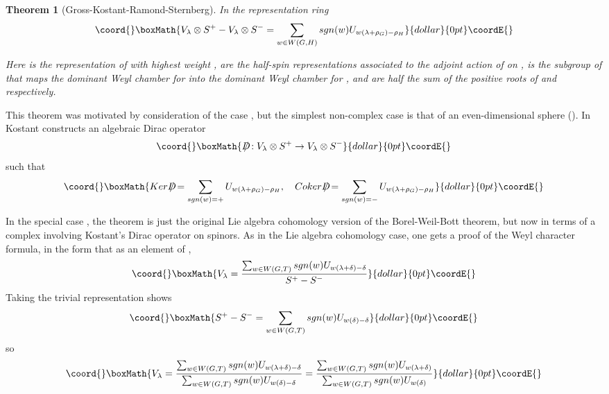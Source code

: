 \documentclass[a4paper,a4paper]{article}
\newtheorem{theorem}{Theorem}
\theoremstyle{conjecture}
\def\Slash#1{#1\!\!\!\!/}
\def\Dirac{\Slash D}
\begin{document}
\begin{theorem}[Gross-Kostant-Ramond-Sternberg]
In the representation ring \coordHE{}  $$\coord{}\boxMath{V_\lambda \otimes S^+ -V_\lambda \otimes S^- = \sum _{w\in W(G,H)} sgn(w)U_{w(\lambda+\rho_G)-\rho_H}}{dollar}{0pt}\coordE{}$$

Here \coordHE{} is the representation of \coordHE{} with highest weight \myHighlight{$\mu$}\coordHE{},
\coordHE{} are the half-spin representations associated to the adjoint
action of \coordHE{} on \coordHE{}, \coordHE{} is
the subgroup of \coordHE{} that maps the dominant Weyl chamber for \coordHE{} into the
dominant Weyl chamber for \coordHE{}, and \coordHE{} are half the sum of the
positive roots of \coordHE{} and \coordHE{} respectively.
\end{theorem}

This theorem was motivated by consideration of the case \coordHE{},
but the simplest non-complex case is that of \coordHE{} an even-dimensional
sphere (\coordHE{}). In \cite{Kostant2} Kostant constructs an algebraic
Dirac operator
$$\coord{}\boxMath{\Dirac :V_\lambda \otimes S^+\rightarrow V_\lambda \otimes S^-}{dollar}{0pt}\coordE{}$$
such that
$$\coord{}\boxMath{ Ker \Dirac =\sum_{sgn(w)=+}U_{w(\lambda+\rho_G)-\rho_H}, \ \ \
Coker \Dirac =\sum_{sgn(w)=-}U_{w(\lambda+\rho_G)-\rho_H}}{dollar}{0pt}\coordE{}$$

In the special case \coordHE{} \cite{Kostant3}, the theorem is just the original Lie algebra
cohomology version of the Borel-Weil-Bott theorem, but now in terms of
a complex involving Kostant's Dirac operator on spinors. As in the Lie algebra cohomology
case, one gets a proof of the Weyl character formula, in the form that as an element of \coordHE{},
$$\coord{}\boxMath{V_\lambda=\frac{\sum _{w\in W(G,T)} sgn(w)U_{w(\lambda+\delta)-\delta}}{S^+ -S^-}}{dollar}{0pt}\coordE{}$$
Taking \myHighlight{$V_\lambda$}\coordHE{} the trivial representation shows
$$\coord{}\boxMath{ S^+ -S^-=\sum _{w\in W(G,T)} sgn(w)U_{w(\delta)-\delta}}{dollar}{0pt}\coordE{}$$
so
$$\coord{}\boxMath{V_\lambda=\frac{\sum _{w\in W(G,T)} sgn(w)U_{w(\lambda+\delta)-\delta}}{\sum _{w\in W(G,T)} sgn(w)U_{w(\delta)-\delta}}=
\frac{\sum _{w\in W(G,T)} sgn(w)U_{w(\lambda+\delta)}}{\sum _{w\in W(G,T)} sgn(w)U_{w(\delta)}}}{dollar}{0pt}\coordE{}$$
\end{document}
